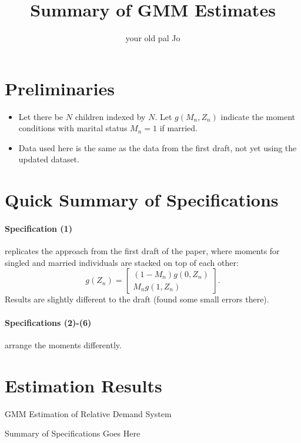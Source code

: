 \documentclass{article}
\title{Summary of GMM Estimates}
\author{your old pal Jo}
\begin{document}
\maketitle
\section*{Preliminaries}
\begin{itemize}
    \item Let there be $N$ children indexed by $N$. Let $g(M_{n},Z_{n})$ indicate the moment conditions with marital status $M_{n}=1$ if married.
    \item Data used here is the same as the data from the first draft, not yet using the updated dataset.
\end{itemize}

\section*{Quick Summary of Specifications}

\paragraph{Specification (1)} replicates the approach from the first draft of the paper, where moments for singled and married individuals are stacked on top of each other:
\[ g(Z_{n}) = \left[\begin{array}{c}(1-M_{n})g(0,Z_{n}) \\ M_{n} g(1,Z_{n})\end{array}\right].\]
Results are slightly different to the draft (found some small errors there).

\paragraph{Specifications (2)-(6)} arrange the moments differently.


\section*{Estimation Results}



\begin{table}\footnotesize\caption{GMM Estimation of Relative Demand System}
    \begin{center}
        
        \captionsetup{width=0.7\textwidth}
        \caption*{Summary of Specifications Goes Here}
    \end{center}
    \end{table}
\end{document}

